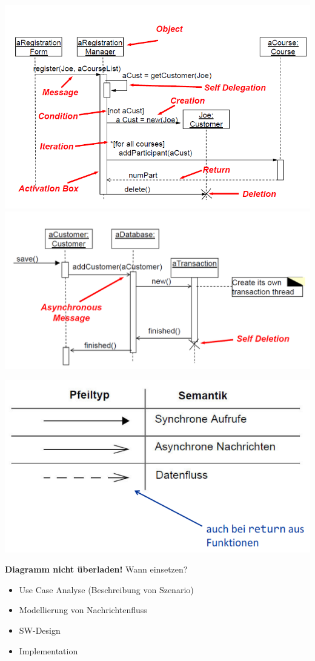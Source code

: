 \begin{multicols}{2}
	\includegraphics[width=\linewidth]{images/Modellierung/Sequenzdiagramm}
	\label{Bild1}
	\vfill\null
	\includegraphics[width=\linewidth]{images/Modellierung/Sequenzdiagramm2}
	\label{Bild2}
\end{multicols}

\includegraphics[width = 0.4\linewidth]{images/Modellierung/Pfeiltypen_Aktivitaetsdiagramm}

\begin{multicols}{2}
\textbf{Diagramm nicht überladen!}
\vfill\null
\columnbreak
Wann einsetzen?
\begin{itemize}
	\item Use Case Analyse (Beschreibung von Szenario)
	\item Modellierung von Nachrichtenfluss
	\item SW-Design
	\item Implementation
\end{itemize}
\end{multicols}

